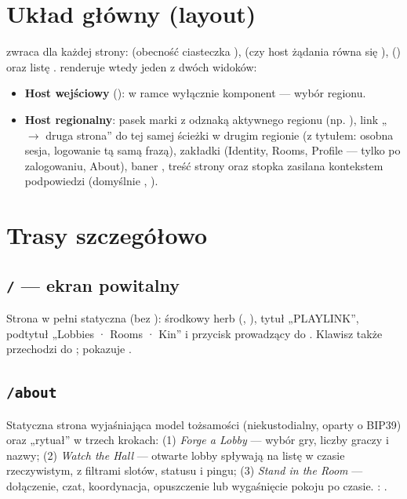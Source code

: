 \section{Układ główny (layout)}\label{sec:fe-layout}

 zwraca dla każdej strony: 
(obecność ciasteczka ),  (czy host żądania równa się
),  () oraz listę .
 renderuje wtedy jeden z dwóch widoków:

\begin{itemize}[nosep]
  \item \textbf{Host wejściowy} (): w ramce  wyłącznie komponent
         --- wybór regionu.
  \item \textbf{Host regionalny}: pasek marki z odznaką aktywnego regionu (np. ),
        link „$\rightarrow$ druga strona” do tej samej ścieżki w drugim regionie
        (z tytułem: osobna sesja, logowanie tą samą frazą), zakładki
        (Identity, Rooms, Profile --- tylko po zalogowaniu, About), baner
        , treść strony oraz stopka 
        zasilana kontekstem podpowiedzi (domyślnie , ).
\end{itemize}

\section{Trasy szczegółowo}\label{sec:fe-trasy-szczegoly}

\subsection{\texttt{/} --- ekran powitalny}

Strona w pełni statyczna (bez ): środkowy herb 
(, ), tytuł „PLAYLINK”, podtytuł „Lobbies · Rooms · Kin”
i przycisk  prowadzący do . Klawisz  także przechodzi
do ;  pokazuje .

\subsection{\texttt{/about}}

Statyczna strona wyjaśniająca model tożsamości (niekustodialny, oparty o BIP39) oraz „rytuał”
w trzech krokach: (1) \emph{Forge a Lobby} --- wybór gry, liczby graczy i nazwy;
(2) \emph{Watch the Hall} --- otwarte lobby spływają na listę w czasie rzeczywistym, z filtrami
slotów, statusu i pingu; (3) \emph{Stand in the Room} --- dołączenie, czat, koordynacja,
opuszczenie lub wygaśnięcie pokoju po czasie. : .

